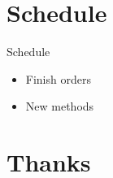 \documentclass[
  5pt,
  ignorenonframetext,
]{beamer}
\providecommand{\tightlist}{%
  \setlength{\itemsep}{0pt}\setlength{\parskip}{0pt}}
\begin{document}
\hypertarget{schedule}{%
\section{Schedule}\label{schedule}}

\begin{frame}{Schedule}
\protect\hypertarget{schedule-1}{}
\begin{itemize}
\tightlist
\item
  Finish orders
\item
  New methods
\end{itemize}
\end{frame}

\hypertarget{thanks}{%
\section{Thanks}\label{thanks}}
\end{document}
